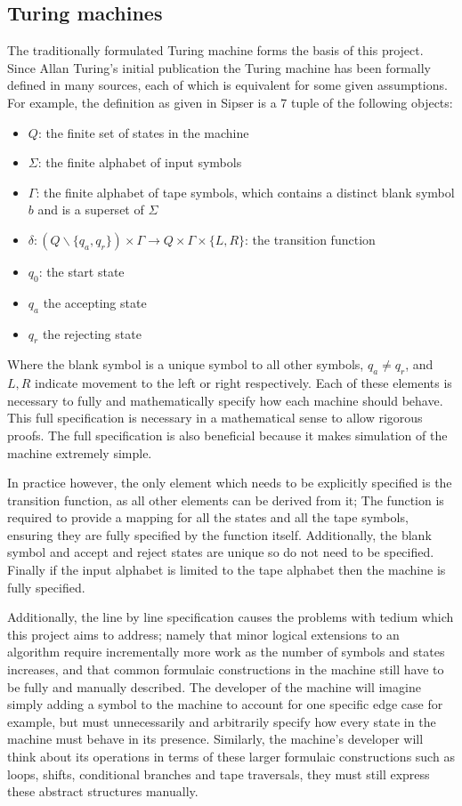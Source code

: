 \documentclass[11pt]{article}
\begin{document}
\subsection{Turing machines}

The traditionally formulated Turing machine forms the basis of this project. Since Allan Turing's initial publication\cite{turing} the Turing machine has been formally defined in many sources, each of which is equivalent for some given assumptions. For example, the definition as given in Sipser\cite{sipser} is a 7 tuple of the following objects:

\begin{itemize}
	\item $Q$: the finite set of states in the machine
	\item $\Sigma$: the finite alphabet of input symbols
	\item $\Gamma$: the finite alphabet of tape symbols, which contains a distinct blank symbol $b$ and is a superset of $\Sigma$
	\item $\delta : (Q\backslash\{q_a, q_r\})\times\Gamma\to Q\times\Gamma\times\{L,R\}$: the transition function
	\item $q_0$: the start state
	\item $q_a$ the accepting state
	\item $q_r$ the rejecting state
\end{itemize}

Where the blank symbol is a unique symbol to all other symbols, $q_{a}\neq q_{r}$, and $L, R$ indicate movement to the left or right respectively. Each of these elements is necessary to fully and mathematically specify how each machine should behave. This full specification is necessary in a mathematical sense to allow rigorous proofs. The full specification is also beneficial because it makes simulation of the machine extremely simple.

In practice however, the only element which needs to be explicitly specified is the transition function, as all other elements can be derived from it; The function is required to provide a mapping for all the states and all the tape symbols, ensuring they are fully specified by the function itself. Additionally, the blank symbol and accept and reject states are unique so do not need to be specified. Finally if the input alphabet is limited to the tape alphabet then the machine is fully specified.

Additionally, the line by line specification causes the problems with tedium which this project aims to address; namely that minor logical extensions to an algorithm require incrementally more work as the number of symbols and states increases, and that common formulaic constructions in the machine still have to be fully and manually described. The developer of the machine will imagine simply adding a symbol to the machine to account for one specific edge case for example, but must unnecessarily and arbitrarily specify how every state in the machine must behave in its presence. Similarly, the machine's developer will think about its operations in terms of these larger formulaic constructions such as loops, shifts, conditional branches and tape traversals, they must still express these abstract structures manually.
\end{document}
